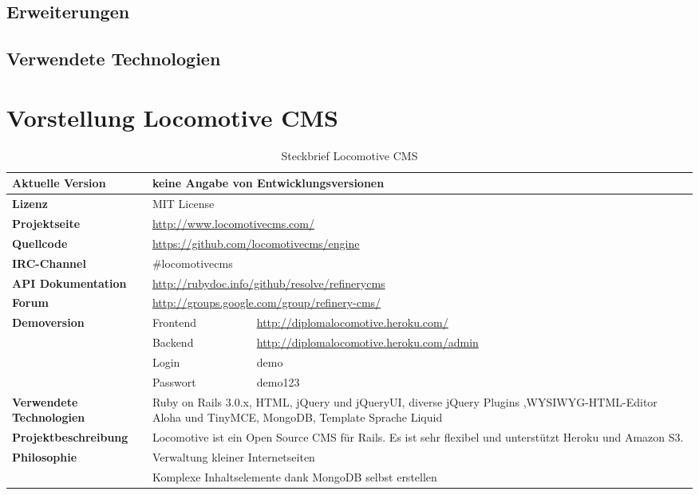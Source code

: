 \subsection{Erweiterungen}
\subsection{Verwendete Technologien}
\newpage
\section{Vorstellung Locomotive CMS}
\begin{table}
\caption{Steckbrief Locomotive CMS}
\begin{tabular}[!ht]{|l|l|l|}
\hline
\textbf{Aktuelle Version} & \multicolumn{2}{p{10cm}|}{keine Angabe von Entwicklungsversionen} \\
\hline
\textbf{Lizenz} & \multicolumn{2}{p{10cm}|}{MIT License} \\
\hline
\textbf{Projektseite} & \multicolumn{2}{p{10cm}|}{\href{http://www.locomotivecms.com/}{http://www.locomotivecms.com/}} \\
\hline
\textbf{Quellcode} & \multicolumn{2}{p{10cm}|}{\href{https://github.com/locomotivecms/engine}{https://github.com/locomotivecms/engine}} \\
\hline
\textbf{IRC-Channel} & \multicolumn{2}{p{10cm}|}{\#locomotivecms} \\
\hline
\textbf{API Dokumentation} & \multicolumn{2}{p{10cm}|}{\href{http://rubydoc.info/github/resolve/refinerycms}{http://rubydoc.info/github/resolve/refinerycms}} \\
\hline
\textbf{Forum} & \multicolumn{2}{p{10cm}|}{\href{http://groups.google.com/group/refinery-cms/}{http://groups.google.com/group/refinery-cms/}} \\
\hline
\textbf{Demoversion} & Frontend & \href{http://diplomalocomotive.heroku.com/}{http://diplomalocomotive.heroku.com/} \\
\cline{2-3}
& Backend & \href{http://diplomalocomotive.heroku.com/admin}{http://diplomalocomotive.heroku.com/admin} \\
\cline{2-3}
& Login & demo \\
\cline{2-3}
& Passwort & demo123 \\
\hline
\textbf{Verwendete Technologien} & \multicolumn{2}{p{10cm}|}{Ruby on Rails 3.0.x, HTML, jQuery und jQueryUI, diverse jQuery Plugins ,WYSIWYG-HTML-Editor Aloha und TinyMCE, MongoDB, Template Sprache Liquid} \\
\hline
\textbf{Projektbeschreibung} & \multicolumn{2}{p{10cm}|}{Locomotive ist ein Open Source CMS für Rails. Es ist sehr flexibel und unterstützt Heroku und Amazon S3.} \\
\hline
\textbf{Philosophie} & \multicolumn{2}{p{10cm}|}{Verwaltung kleiner Internetseiten} \\
& \multicolumn{2}{p{10cm}|}{Komplexe Inhaltselemente dank MongoDB selbst erstellen}\\
\hline
\end{tabular}
\end{table}
